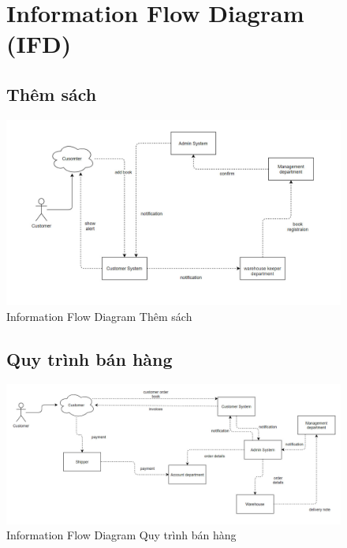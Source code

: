 \documentclass{report}
\begin{document}
\begin{center}
    \begin{figure}[htp]
        \section{Information Flow Diagram (IFD)}
        \subsection{Thêm sách}
        \begin{center}
            \includegraphics[scale = 0.65]{image/ifd_addbook.png}
        \end{center}
        \caption{Information Flow Diagram Thêm sách}
    \end{figure}
\end{center}

\begin{center}
    \begin{figure}[htp]
        \subsection{Quy trình bán hàng}
        \begin{center}
            \includegraphics[scale = 0.5]{image/ifd_quytrinhbanhang.png}
        \end{center}
        \caption{Information Flow Diagram Quy trình bán hàng}
    \end{figure}
\end{center}
\end{document}
